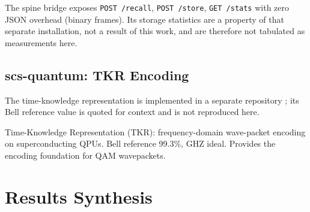 \documentclass[sigconf,anonymous=false]{acmart}
\begin{document}
The spine bridge exposes \texttt{POST /recall}, \texttt{POST /store}, \texttt{GET /stats} with zero JSON overhead (binary frames). Its storage statistics are a property of that separate installation, not a result of this work, and are therefore not tabulated as measurements here.

\subsection{scs-quantum: TKR Encoding}

The time-knowledge representation is implemented in a separate repository
\cite{scsQuantum}; its Bell reference value is quoted for context and is not reproduced here.

Time-Knowledge Representation (TKR): frequency-domain wave-packet encoding on superconducting QPUs. Bell reference 99.3\%, GHZ ideal. Provides the encoding foundation for QAM wavepackets.

\section{Results Synthesis}
\end{document}
